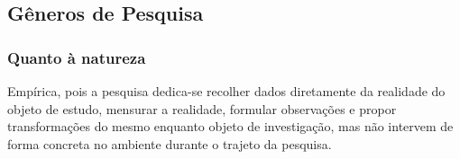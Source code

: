 \documentclass[
	12pt,				%
	openright,			%
	oneside,
	a4paper,			%
	english,			%
	french,				%
	spanish,			%
	brazil,				%
	]{abntex2}
\begin{document}

\subsection{Gêneros de Pesquisa}
\subsubsection{Quanto à natureza}
Empírica, pois a pesquisa dedica-se recolher dados diretamente da realidade do objeto de estudo, mensurar a realidade, formular observações e propor transformações do mesmo enquanto objeto de investigação, mas não intervem de forma concreta no ambiente durante o trajeto da pesquisa.
\end{document}
